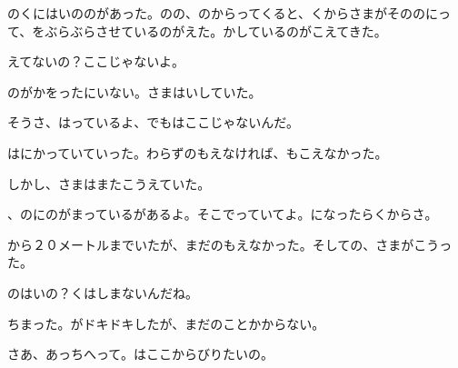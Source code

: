 のくにはいののがあった。のの、のからってくると、くからさまがそののにって、をぶらぶらさせているのがえた。かしているのがこえてきた。

えてないの？ここじゃないよ。

のがかをったにいない。さまはいしていた。

そうさ、はっているよ、でもはここじゃないんだ。

はにかっていていった。わらずのもえなければ、もこえなかった。

しかし、さまはまたこうえていた。

、のにのがまっているがあるよ。そこでっていてよ。になったらくからさ。

から２０メートルまでいたが、まだのもえなかった。そしての、さまがこうった。

のはいの？くはしまないんだね。

ちまった。がドキドキしたが、まだのことかからない。

さあ、あっちへって。はここからびりたいの。

